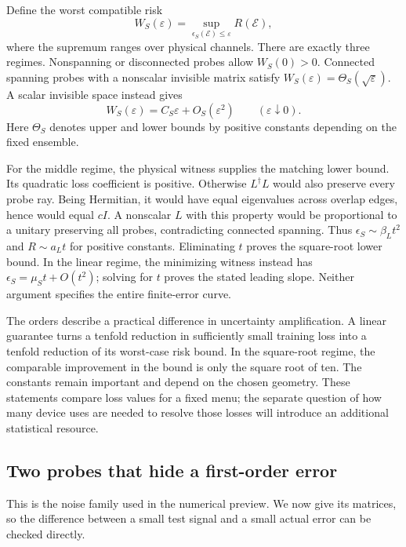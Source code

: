 \documentclass[11pt,a4paper]{article}
\numberwithin{equation}{section}
\begin{document}
Define the worst compatible risk
\[
W_S(\varepsilon)=\sup_{\epsilon_S(\mathcal E)\leq\varepsilon}R(\mathcal E),
\]
where the supremum ranges over physical channels. There are exactly three regimes. Nonspanning or disconnected probes allow $W_S(0)>0$. Connected spanning probes with a nonscalar invisible matrix satisfy $W_S(\varepsilon)=\Theta_S(\sqrt\varepsilon)$. A scalar invisible space instead gives
\[
W_S(\varepsilon)=C_S\varepsilon+O_S(\varepsilon^2)
\qquad(\varepsilon\downarrow0).
\]
Here $\Theta_S$ denotes upper and lower bounds by positive constants depending on the fixed ensemble.

For the middle regime, the physical witness supplies the matching lower bound. Its quadratic loss coefficient is positive. Otherwise $L^\dagger L$ would also preserve every probe ray. Being Hermitian, it would have equal eigenvalues across overlap edges, hence would equal $cI$. A nonscalar $L$ with this property would be proportional to a unitary preserving all probes, contradicting connected spanning. Thus $\epsilon_S\sim\beta_Lt^2$ and $R\sim a_Lt$ for positive constants. Eliminating $t$ proves the square-root lower bound. In the linear regime, the minimizing witness instead has $\epsilon_S=\mu_St+O(t^2)$; solving for $t$ proves the stated leading slope. Neither argument specifies the entire finite-error curve.

The orders describe a practical difference in uncertainty amplification. A linear guarantee turns a tenfold reduction in sufficiently small training loss into a tenfold reduction of its worst-case risk bound. In the square-root regime, the comparable improvement in the bound is only the square root of ten. The constants remain important and depend on the chosen geometry. These statements compare loss values for a fixed menu; the separate question of how many device uses are needed to resolve those losses will introduce an additional statistical resource.

\subsection{Two probes that hide a first-order error}

\label{sec:qubit-example}
This is the noise family used in the numerical preview. We now give its
matrices, so the difference between a small test signal and a small actual
error can be checked directly.
\end{document}

